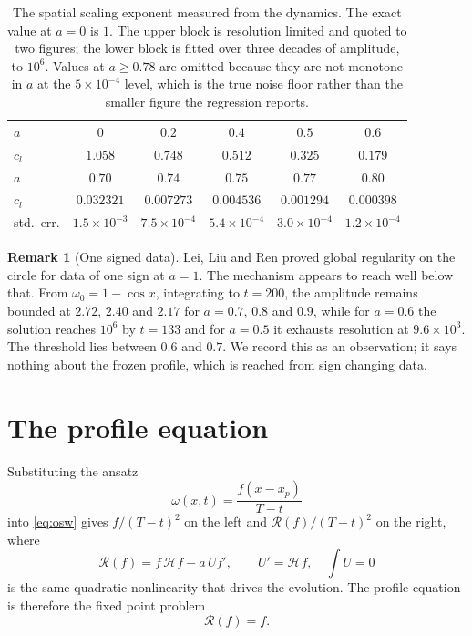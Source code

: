 \documentclass[11pt]{article}
\theoremstyle{definition}
\newtheorem{remark}[proposition]{Remark}
\newcommand{\Hil}{\mathcal{H}}
\begin{document}
\begin{table}[htbp]
\centering
\begin{tabular}{lccccc}
\toprule
$a$ & $0$ & $0.2$ & $0.4$ & $0.5$ & $0.6$\\
$c_l$ & $1.058$ & $0.748$ & $0.512$ & $0.325$ & $0.179$\\
\midrule
$a$ & $0.70$ & $0.74$ & $0.75$ & $0.77$ & $0.80$\\
$c_l$ & $0.032321$ & $0.007273$ & $0.004536$ & $0.001294$ & $0.000398$\\
std.\ err. & $1.5\times10^{-3}$ & $7.5\times10^{-4}$ & $5.4\times10^{-4}$
      & $3.0\times10^{-4}$ & $1.2\times10^{-4}$\\
\bottomrule
\end{tabular}
\caption{The spatial scaling exponent measured from the dynamics. The exact
value at $a=0$ is $1$. The upper block is resolution limited and quoted to two
figures; the lower block is fitted over three decades of amplitude, to $10^6$.
Values at $a\ge 0.78$ are omitted because they are not monotone in $a$ at the
$5\times10^{-4}$ level, which is the true noise floor rather than the smaller
figure the regression reports.}
\label{tab:cl}
\end{table}

\begin{remark}[One signed data]
\label{rem:onesigned}
Lei, Liu and Ren \cite{llr2020} proved global regularity on the circle for data
of one sign at $a=1$. The mechanism appears to reach well below that. From
$\omega_0 = 1-\cos x$, integrating to $t=200$, the amplitude remains bounded at
$2.72$, $2.40$ and $2.17$ for $a=0.7$, $0.8$ and $0.9$, while for $a=0.6$ the
solution reaches $10^6$ by $t=133$ and for $a=0.5$ it exhausts resolution at
$9.6\times10^3$. The threshold lies between $0.6$ and $0.7$. We record this as
an observation; it says nothing about the frozen profile, which is reached from
sign changing data.
\end{remark}

\section{The profile equation}
\label{sec:profile}

Substituting the ansatz
\begin{equation}
  \omega(x,t) = \frac{f(x-x_p)}{T-t}
  \label{eq:ansatz}
\end{equation}
into \eqref{eq:osw} gives $f/(T-t)^2$ on the left and
$\mathcal{R}(f)/(T-t)^2$ on the right, where
\begin{equation}
  \mathcal{R}(f) = f\,\Hil f - a\,U f', \qquad U' = \Hil f,
  \quad \textstyle\int U = 0
\end{equation}
is the same quadratic nonlinearity that drives the evolution. The profile
equation is therefore the fixed point problem
\begin{equation}
  \boxed{\;\mathcal{R}(f) = f.\;}
  \label{eq:profile}
\end{equation}
\end{document}
